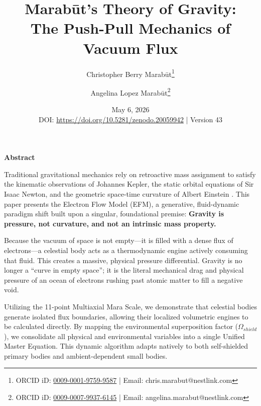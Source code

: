 \documentclass[11pt, a4paper]{article}
\title{\textbf{Marab\={u}t's Theory of Gravity: \\ The Push-Pull Mechanics of Vacuum Flux}}
\author[1]{Christopher Berry Marab\={u}t\thanks{ORCID iD: \href{https://orcid.org/0009-0001-9759-9587}{0009-0001-9759-9587} | Email: chris.marabut@nestlink.com}}
\author[1]{Angelina Lopez Marab\={u}t\thanks{ORCID iD: \href{https://orcid.org/0009-0007-9937-6145}{0009-0007-9937-6145} | Email: angelina.marabut@nestlink.com}}
\affil[1]{Independent Researchers}
\date{May 6, 2026 \\[1.5em] \small{DOI: \url{https://doi.org/10.5281/zenodo.20059942} | Version 43}}
\begin{document}

\maketitle

\begingroup
  \small
  \begin{center}
    \textbf{Abstract}
  \end{center}
  \vspace{-0.5em}

  Traditional gravitational mechanics rely on retroactive mass assignment to satisfy the kinematic observations of Johannes Kepler, the static orbital equations of Sir Isaac Newton, and the geometric space-time curvature of Albert Einstein \cite{kepler1609, newton1687, einstein1915}. This paper presents the Electron Flow Model (EFM), a generative, fluid-dynamic paradigm shift built upon a singular, foundational premise: \textbf{Gravity is pressure, not curvature, and not an intrinsic mass property.} 

  Because the vacuum of space is not empty---it is filled with a dense flux of electrons---a celestial body acts as a thermodynamic engine actively consuming that fluid. This creates a massive, physical pressure differential. Gravity is no longer a ``curve in empty space''; it is the literal mechanical drag and physical pressure of an ocean of electrons rushing past atomic matter to fill a negative void.

  Utilizing the 11-point Multiaxial Mara Scale, we demonstrate that celestial bodies generate isolated flux boundaries, allowing their localized volumetric engines to be calculated directly. By mapping the environmental superposition factor ($\Omega_{shield}$), we consolidate all physical and environmental variables into a single Unified Master Equation. This dynamic algorithm adapts natively to both self-shielded primary bodies and ambient-dependent small bodies. 
  
\end{document}
